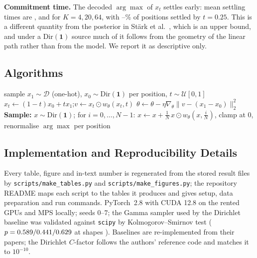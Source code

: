 \documentclass{article}
\begin{document}
\begin{table}[h]
\centering
\caption{Full guidance sweep; Table~\ref{tab:guidance} reports the $\gamma\in\{1,8\}$ columns.}
\label{tab:guidance_full}
\small

\end{table}

\textbf{Commitment time.} The decoded $\arg\max$ of $x_t$ settles early: mean settling times are
\CommitDna, \CommitProt{} and \CommitCodon{} for $K=4,20,64$, with
\CommitSettledLo--\CommitSettledHi\% of positions settled by $t=0.25$. This is a different
quantity from the posterior in St\"ark et al.~\citep[Prop.~1]{stark2024dirichlet}, which is an upper bound, and
under a $\mathrm{Dir}(\mathbf 1)$ source much of it follows from the geometry of the linear path
rather than from the model. We report it as descriptive only.

\subsection{Algorithms}
\label{app:alg}
\begin{algorithm}[h]
\caption{Training and sampling with the multiplicative factor ($\theta$ is the only trainable component)}
\label{alg:train}
\begin{algorithmic}[1]
  \State sample $x_1\sim\mathcal D$ (one-hot), $x_0\sim\mathrm{Dir}(\mathbf 1)$ per position, $t\sim\mathcal U[0,1]$
  \State $x_t\gets(1-t)x_0+tx_1$;\quad $v\gets x_t\odot w_\theta(x_t,t)$ 
  \State $\theta\gets\theta-\eta\nabla_\theta\lVert v-(x_1-x_0)\rVert_2^2$
\EndFor
\State \textbf{Sample:} $x\sim\mathrm{Dir}(\mathbf 1)$; for $i=0,\dots,N-1$: $x\gets x+\tfrac1N\,x\odot w_\theta(x,\tfrac iN)$, clamp at $0$, renormalise
\State \Return $\arg\max$ per position
\end{algorithmic}
\end{algorithm}

\subsection{Implementation and Reproducibility Details}
Every table, figure and in-text number is regenerated from the stored result files by
\texttt{scripts/make\_tables.py} and \texttt{scripts/make\_figures.py}; the repository README maps
each script to the tables it produces and gives setup, data preparation and run commands.
PyTorch~2.8 with CUDA 12.8 on the rented GPUs and MPS locally; seeds $0$--$7$; the Gamma sampler
used by the Dirichlet baseline was validated against \texttt{scipy} by Kolmogorov--Smirnov test
($p=0.589/0.441/0.629$ at shapes \GammaShapes). Baselines are re-implemented from their papers; the
Dirichlet $C$-factor follows the authors' reference code and matches it to $10^{-10}$.
\end{document}
